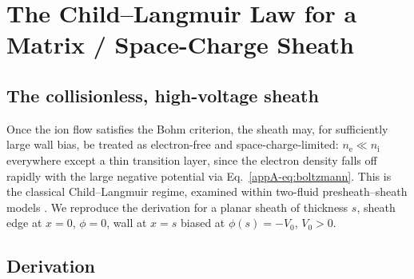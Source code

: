 \section{The Child--Langmuir Law for a Matrix / Space-Charge Sheath}
\label{sec:cl}

\subsection{The collisionless, high-voltage sheath}

Once the ion flow satisfies the Bohm criterion, the sheath may, for sufficiently large wall bias, be treated as electron-free and space-charge-limited: $n_{\mathrm{e}} \ll n_{\mathrm{i}}$ everywhere except a thin transition layer, since the electron density falls off rapidly with the large negative potential via Eq.~\eqref{appA-eq:boltzmann}. This is the classical Child--Langmuir regime, examined within two-fluid presheath--sheath models \cite{ref0023}. We reproduce the derivation for a planar sheath of thickness $s$, sheath edge at $x=0$, $\phi=0$, wall at $x=s$ biased at $\phi(s) = -V_{0}$, $V_{0}>0$.

\subsection{Derivation}

